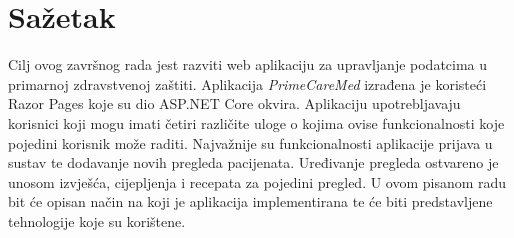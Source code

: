 \section*{Sažetak}
\label{sec:summary}
Cilj ovog završnog rada jest razviti web aplikaciju za upravljanje podatcima u primarnoj zdravstvenoj zaštiti. Aplikacija \textit{PrimeCareMed} izrađena je koristeći Razor Pages koje su dio ASP.NET Core okvira. Aplikaciju upotrebljavaju korisnici koji mogu imati četiri različite uloge o kojima ovise funkcionalnosti koje pojedini korisnik može raditi. Najvažnije su funkcionalnosti aplikacije prijava u sustav te dodavanje novih pregleda pacijenata. Uređivanje pregleda ostvareno je unosom izvješća, cijepljenja i recepata za pojedini pregled. U ovom pisanom radu bit će opisan način na koji je aplikacija implementirana te će biti predstavljene tehnologije koje su korištene.
